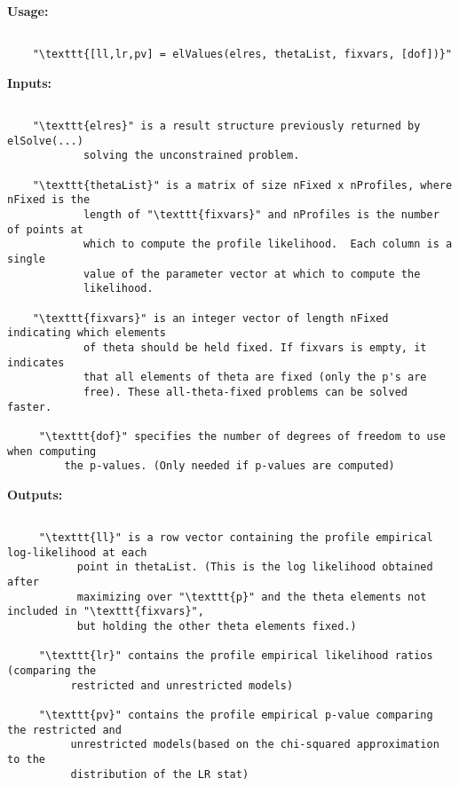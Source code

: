 {\small\textbf{Usage:}}
\begin{lstlisting}
 
    "\texttt{[ll,lr,pv] = elValues(elres, thetaList, fixvars, [dof])}"
 \end{lstlisting}
{\small\textbf{Inputs:}}
\begin{lstlisting}
 
    "\texttt{elres}" is a result structure previously returned by elSolve(...)
            solving the unconstrained problem.
 
    "\texttt{thetaList}" is a matrix of size nFixed x nProfiles, where nFixed is the
            length of "\texttt{fixvars}" and nProfiles is the number of points at
            which to compute the profile likelihood.  Each column is a single
            value of the parameter vector at which to compute the
            likelihood.
 
    "\texttt{fixvars}" is an integer vector of length nFixed indicating which elements
            of theta should be held fixed. If fixvars is empty, it indicates
            that all elements of theta are fixed (only the p's are
            free). These all-theta-fixed problems can be solved faster.
 
     "\texttt{dof}" specifies the number of degrees of freedom to use when computing
         the p-values. (Only needed if p-values are computed)
 \end{lstlisting}
{\small\textbf{Outputs:}}
\begin{lstlisting}
 
     "\texttt{ll}" is a row vector containing the profile empirical log-likelihood at each
           point in thetaList. (This is the log likelihood obtained after
           maximizing over "\texttt{p}" and the theta elements not included in "\texttt{fixvars}",
           but holding the other theta elements fixed.)
 
     "\texttt{lr}" contains the profile empirical likelihood ratios (comparing the
          restricted and unrestricted models)
 
     "\texttt{pv}" contains the profile empirical p-value comparing the restricted and
          unrestricted models(based on the chi-squared approximation to the
          distribution of the LR stat)
 

\end{lstlisting}
